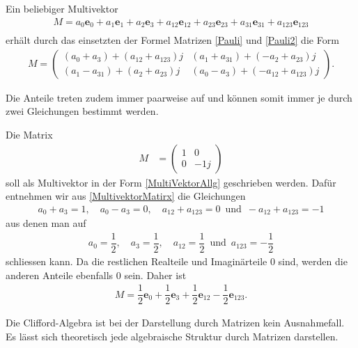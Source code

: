 \begin{hilfssatz}
	Ein beliebiger Multivektor
	\begin{align} \label{MultiVektorAllg}
		M = a_0\mathbf{e}_0 + a_1\mathbf{e}_1 + a_2\mathbf{e}_3 + a_{12}\mathbf{e}_{12} + a_{23}\mathbf{e}_{23} + a_{31}\mathbf{e}_{31} + a_{123}\mathbf{e}_{123}\\
	\end{align}
	erhält durch das einsetzten der Formel Matrizen \eqref{Pauli} und \eqref{Pauli2} die Form
	\begin{align}
		M =
		\begin{pmatrix}
			(a_0+a_3) + (a_{12}+a_{123})j & (a_1+a_{31})+(-a_2+a_{23})j \\
			(a_1-a_{31})+(a_2+a_{23})j & (a_0-a_3)+(-a_{12}+a_{123})j
		\end{pmatrix}.\label{MultivektorMatirx}
	\end{align}
\end{hilfssatz}
Die Anteile treten zudem immer paarweise auf und können somit immer je durch zwei Gleichungen bestimmt werden.
\begin{beispiel}
	Die Matrix
	\begin{align}
		M &= 
		\begin{pmatrix}
			1 & 0 \\
			0 & -1j
		\end{pmatrix}
	\end{align}
	soll als Multivektor in der Form \eqref{MultiVektorAllg} geschrieben werden. Dafür entnehmen wir aus \eqref{MultivektorMatirx} die Gleichungen
	\begin{align}
		a_0 + a_3 = 1,\quad a_0 - a_3 = 0,\quad a_{12}+a_{123} = 0\enspace\text{und}\enspace -a_{12}+a_{123}=-1
	\end{align}
	aus denen man auf
	\begin{align}
		a_0 = \dfrac{1}{2},\quad a_3 = \dfrac{1}{2},\quad a_{12}=\dfrac{1}{2}\enspace\text{und}\enspace a_{123}=-\dfrac{1}{2}
	\end{align}
	schliessen kann. Da die restlichen Realteile und Imaginärteile 0 sind, werden die anderen Anteile ebenfalls 0 sein. Daher ist
	\begin{align}
		M = \dfrac{1}{2} \mathbf{e}_0+ \dfrac{1}{2} \mathbf{e}_3 + \dfrac{1}{2} \mathbf{e}_{12} - \dfrac{1}{2} \mathbf{e}_{123}.
	\end{align}
\end{beispiel}
Die Clifford-Algebra ist bei der Darstellung durch Matrizen kein Ausnahmefall. Es lässt sich theoretisch jede algebraische Struktur durch Matrizen darstellen.